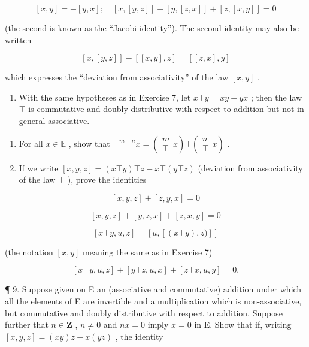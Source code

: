 \[
[ x, y ] = - [ y, x ]; \quad [ x, [ y, z ] ] + [ y, [ z, x ] ] + [ z, [ x, y ] ] = 0
\]

(the second is known as the ``Jacobi identity''). The second identity may also be written

\[
[ x, [ y, z ] ] - [ [ x, y ], z ] = [ [ z, x ], y ]
\]

which expresses the ``deviation from associativity'' of the law \([x, y]\) .

\begin{enumerate}
\def\labelenumi{\arabic{enumi}.}
\setcounter{enumi}{7}
\tightlist
\item
  With the same hypotheses as in Exercise 7, let \(x \top y = xy + yx\) ; then the law \(\top\) is commutative and doubly distributive with respect to addition but not in general associative.
\end{enumerate}

\begin{enumerate}
\def\labelenumi{(\alph{enumi})}
\item
  For all \(x \in \mathbb{E}\) , show that \(\top^{m+n} x = \left( \begin{array}{c} m \\ \top \end{array} x \right) \top \left( \begin{array}{c} n \\ \top \end{array} x \right)\) .
\item
  If we write \([x, y, z] = (x \top y) \top z - x \top (y \top z)\) (deviation from associativity of the law \(\top\) ), prove the identities
\end{enumerate}

\[
[ x, y, z ] + [ z, y, x ] = 0
\]

\[
[ x, y, z ] + [ y, z, x ] + [ z, x, y ] = 0
\]

\[
[ x \top y, u, z ] = [ u, [ (x \top y), z) ] ]
\]

(the notation \([x, y]\) meaning the same as in Exercise 7)

\[
[ x \top y, u, z ] + [ y \top z, u, x ] + [ z \top x, u, y ] = 0.
\]

¶ 9. Suppose given on E an (associative and commutative) addition under which all the elements of E are invertible and a multiplication which is non-associative, but commutative and doubly distributive with respect to addition. Suppose further that \(n \in \mathbf{Z}\) , \(n \neq 0\) and \(nx = 0\) imply \(x = 0\) in E. Show that if, writing \([x, y, z] = (xy)z - x(yz)\) , the identity

